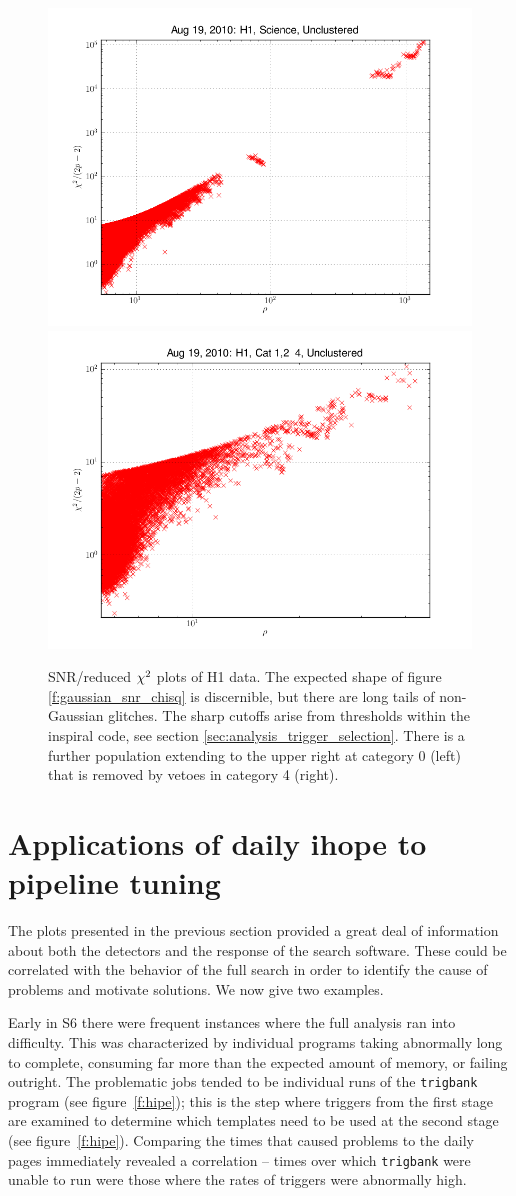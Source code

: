 \begin{figure}
  \includegraphics[width=0.5\linewidth]{figures/detchar/H1_0_UNCLUSTERED_chisq.png}
  \includegraphics[width=0.5\linewidth]{figures/detchar/H1_4_UNCLUSTERED_chisq.png}
  \caption[SNR/reduced $\chisq$ plots of H1 data.]{
  \label{f:daily_ihope_snr_chisq}
SNR/reduced $\chisq$ plots of H1 data.  The expected shape
of figure \ref{f:gaussian_snr_chisq} is discernible, but there are
long tails of non-Gaussian glitches.  The sharp cutoffs arise 
from thresholds within the inspiral code, see section
\ref{sec:analysis_trigger_selection}.  There is a further
population extending to the upper right at category 0 (left) that is
removed by vetoes in category 4 (right).}
\end{figure}%


\section{Applications of daily ihope to pipeline tuning}
\label{sec:applications_pipeline}


The plots presented in the previous section provided a great deal of
information about both the detectors and the response of the search
software.  These could be correlated with the behavior of the full
search in order to identify the cause of problems and motivate
solutions.  We now give two examples.

Early in S6 there were frequent instances where the full analysis ran
into difficulty.  This was characterized by individual programs taking
abnormally long to complete, consuming far more than the expected
amount of memory, or failing outright.  The problematic jobs tended to
be individual runs of the \texttt{trigbank} program (see
figure~\ref{f:hipe}); this is the step where triggers from the first
stage are examined to determine which templates need to be used at the
second stage (see figure~\ref{f:hipe}).  Comparing the times that
caused problems to the daily pages immediately revealed a correlation
-- times over which \texttt{trigbank} were unable to run were those
where the rates of triggers were abnormally high.

